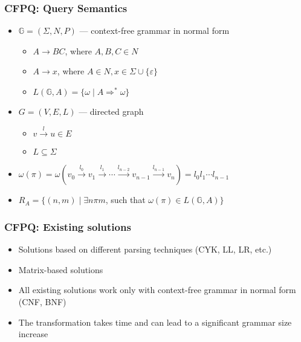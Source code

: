 \documentclass[xcolor=table]{beamer}
\begin{document}
  \begin{frame}[fragile]
    \frametitle{CFPQ: Query Semantics}
    \begin{itemize}
      \item $\mathbb{G} = (\Sigma, N, P)$ --- context-free grammar in normal form
      \begin{itemize}
        \item $A \rightarrow B C$, where $A, B, C \in N$
        \item $A \rightarrow x$, where $A \in N, x \in \Sigma \cup \{\varepsilon\}$
        \item $L(\mathbb{G},A) = \{ \omega \mid A \Rightarrow^* \omega \}$
      \end{itemize}
      \pause
      \item $G = (V,E,L)$ --- directed graph
        \begin{itemize}
          \item $v \xrightarrow{l} u \in E$
          \item $L \subseteq \Sigma$
        \end{itemize}
        \pause
      \item $\omega(\pi) = \omega(v_0 \xrightarrow{l_0} v_1 \xrightarrow{l_1} \cdots \xrightarrow{l_{n-2}} v_{n-1} \xrightarrow{l_{n-1}} v_n) = l_0 l_1 \cdots l_{n-1}$
      \pause
      \item $R_A = \{ (n, m) \mid \exists n \pi m$, such that $\omega(\pi) \in L(\mathbb{G},A)\}$
    \end{itemize}
  \end{frame}

  \begin{frame}[fragile] \frametitle{CFPQ: Existing solutions}
    	\begin{itemize}
    		\item Solutions based on different parsing techniques (CYK, LL, LR, etc.)
    		\pause
    		\item Matrix-based solutions
    		\pause
    		\item All existing solutions work only with context-free grammar in normal form (CNF, BNF)
    		\pause
    		\item The transformation takes time and can lead to a significant grammar size increase
    		
    	\end{itemize}
  \end{frame}
\end{document}
